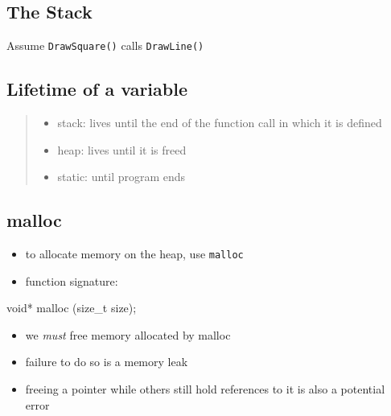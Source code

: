 \documentclass[
]{article}
\newenvironment{Shaded}{}{}
\newcommand{\DataTypeTok}[1]{\textcolor[rgb]{0.56,0.13,0.00}{#1}}
\newcommand{\NormalTok}[1]{#1}
\providecommand{\tightlist}{%
  \setlength{\itemsep}{0pt}\setlength{\parskip}{0pt}}
\begin{document}
\hypertarget{the-stack}{%
\subsection{The Stack}\label{the-stack}}

Assume \texttt{DrawSquare()} calls \texttt{DrawLine()}

\hypertarget{lifetime-of-a-variable}{%
\subsection{Lifetime of a variable}\label{lifetime-of-a-variable}}

\begin{quote}
\begin{itemize}
\tightlist
\item
  stack: lives until the end of the function call in which it is defined
\item
  heap: lives until it is freed
\item
  static: until program ends
\end{itemize}
\end{quote}

\hypertarget{malloc}{%
\subsection{malloc}\label{malloc}}

\begin{itemize}
\tightlist
\item
  to allocate memory on the heap, use \texttt{malloc}
\item
  function signature:
\end{itemize}

\begin{Shaded}
\begin{Highlighting}[]
\DataTypeTok{void}\NormalTok{* malloc (}\DataTypeTok{size\_t}\NormalTok{ size);}
\end{Highlighting}
\end{Shaded}

\begin{itemize}
\tightlist
\item
  we \emph{must} free memory allocated by malloc
\item
  failure to do so is a memory leak
\item
  freeing a pointer while others still hold references to it is also a
  potential error
\end{itemize}
\end{document}

